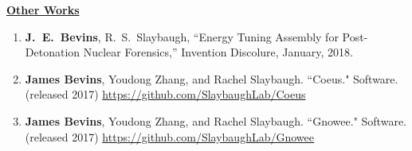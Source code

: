 
\underline{\textbf{Other Works}}

\begin{enumerate}

\item \textbf{J.\ E.\ Bevins}, R.\ S.\ Slaybaugh, ``Energy Tuning Assembly for Post-Detonation Nuclear Forensics,” Invention Discolure, January, 2018.

\item \textbf{James Bevins}, Youdong Zhang, and Rachel Slaybaugh. ``Coeus." Software. (released 2017) \url{https://github.com/SlaybaughLab/Coeus} 

\item \textbf{James Bevins}, Youdong Zhang, and Rachel Slaybaugh. ``Gnowee." Software. (released 2017) \url{https://github.com/SlaybaughLab/Gnowee}
\end{enumerate} 
